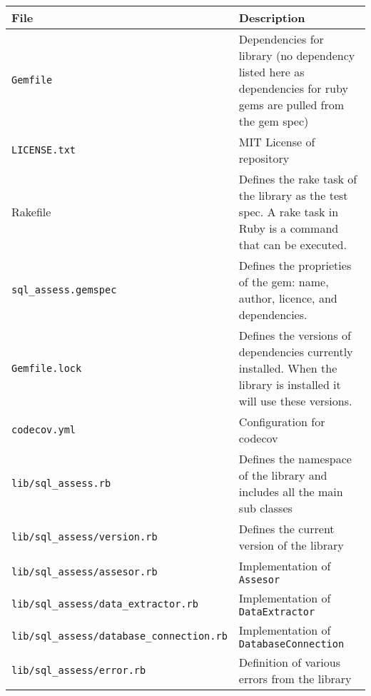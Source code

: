 \begin{tabularx}{\textwidth}{|Y|Y|}
    \hline
    \textbf{File} & \textbf{Description} \\\hline
    \endhead
    \texttt{Gemfile} & Dependencies for library (no dependency listed here as dependencies for ruby gems are pulled from the gem spec) \\\hline
    \texttt{LICENSE.txt} & MIT License of repository \\\hline
    Rakefile & Defines the rake task of the library as the test spec. A rake task in Ruby is a command that can be executed. \\\hline
    \texttt{sql\_assess.gemspec} & Defines the proprieties of the gem: name, author, licence, and dependencies. \\\hline
    \texttt{Gemfile.lock} & Defines the versions of dependencies currently installed. When the library is installed it will use these versions. \\\hline
    \texttt{codecov.yml} & Configuration for codecov \\\hline
    \texttt{lib/sql\_assess.rb} & Defines the namespace of the library and includes all the main sub classes \\\hline
    \texttt{lib/sql\_assess/version.rb} & Defines the current version of the library \\\hline
    \texttt{lib/sql\_assess/assesor.rb} & Implementation of \texttt{Assesor} \\\hline
    \texttt{lib/sql\_assess/data_extractor.rb} & Implementation of \texttt{DataExtractor} \\\hline
    \texttt{lib/sql\_assess/database\_connection.rb} & Implementation of \texttt{DatabaseConnection} \\\hline
    \texttt{lib/sql\_assess/error.rb} & Definition of various errors from the library \\\hline
\end{tabularx}
